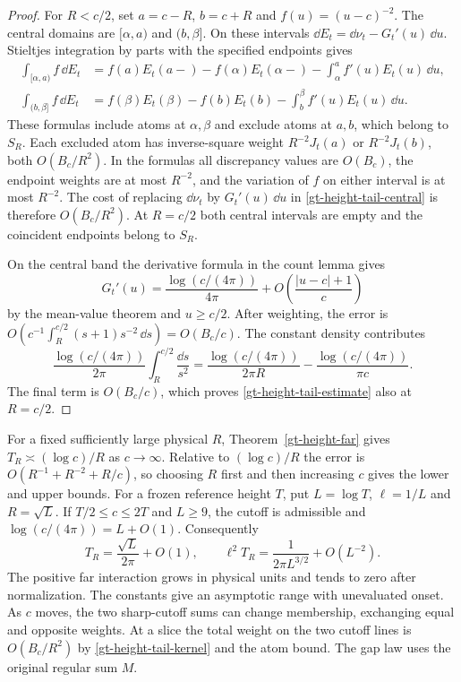 \begin{proof}
For \(R<c/2\), set \(a=c-R\), \(b=c+R\) and
\(f(u)=(u-c)^{-2}\). The central domains are
\([\alpha,a)\) and \((b,\beta]\).
On these intervals \(\dd E_t=\dd\nu_t-G_t'(u)\,\dd u\).
Stieltjes integration by parts with the specified endpoints gives
\begin{align*}
 \int_{[\alpha,a)} f\,\dd E_t
  &= f(a)E_t(a-)-f(\alpha)E_t(\alpha-)
      -\int_\alpha^a f'(u)E_t(u)\,\dd u,\\
 \int_{(b,\beta]} f\,\dd E_t
  &= f(\beta)E_t(\beta)-f(b)E_t(b)
      -\int_b^\beta f'(u)E_t(u)\,\dd u .
\end{align*}
These formulas include atoms at \(\alpha,\beta\) and exclude
atoms at \(a,b\), which belong to \(S_R\). Each excluded atom has
inverse-square weight \(R^{-2}J_t(a)\) or \(R^{-2}J_t(b)\), both
\(O(B_c/R^2)\). In the formulas all discrepancy values are
\(O(B_c)\), the endpoint weights are at most \(R^{-2}\), and
the variation of \(f\) on either interval is at most \(R^{-2}\).
The cost of replacing \(\dd\nu_t\) by \(G_t'(u)\,\dd u\)
in \eqref{gt-height-tail-central} is therefore \(O(B_c/R^2)\).
At \(R=c/2\) both central intervals are empty and the coincident
endpoints belong to \(S_R\).

On the central band the derivative formula in the count lemma gives
\[
 G_t'(u)=\frac{\log(c/(4\pi))}{4\pi}
          +O\!\left(\frac{|u-c|+1}{c}\right)
\]
by the mean-value theorem and \(u\ge c/2\). After weighting,
the error is \(O(c^{-1}\int_R^{c/2}(s+1)s^{-2}\,\dd s)
=O(B_c/c)\). The constant density contributes
\[
 \frac{\log(c/(4\pi))}{2\pi}\int_R^{c/2}\frac{\dd s}{s^2}
 =\frac{\log(c/(4\pi))}{2\pi R}-\frac{\log(c/(4\pi))}{\pi c}.
\]
The final term is \(O(B_c/c)\), which proves
\eqref{gt-height-tail-estimate} also at \(R=c/2\).
\end{proof}

For a fixed sufficiently large physical \(R\),
Theorem~\ref{gt-height-far} gives \(T_R\asymp(\log c)/R\) as
\(c\to\infty\). Relative to \((\log c)/R\) the error is
\(O(R^{-1}+R^{-2}+R/c)\), so choosing \(R\) first and then
increasing \(c\) gives the lower and upper bounds. For a frozen
reference height \(T\), put \(L=\log T\), \(\ell=1/L\) and
\(R=\sqrt L\). If \(T/2\le c\le2T\) and \(L\ge9\), the cutoff
is admissible and \(\log(c/(4\pi))=L+O(1)\). Consequently
\begin{equation}
 T_R=\frac{\sqrt L}{2\pi}+O(1),\qquad
 \ell^2 T_R=\frac{1}{2\pi L^{3/2}}+O(L^{-2}).
 \label{gt-height-normalized-tail}
\end{equation}
The positive far interaction grows in physical units and tends to
zero after normalization. The constants give an asymptotic range
with unevaluated onset. As \(c\) moves, the two sharp-cutoff sums
can change membership, exchanging equal and opposite weights.
At a slice the total weight on the two cutoff lines is \(O(B_c/R^2)\)
by \eqref{gt-height-tail-kernel} and the atom bound. The gap law
uses the original regular sum \(M\).

